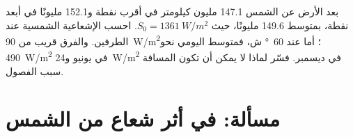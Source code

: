 \begin{exercise}[$\star\star\star$]\label{exo:g10:earth-energy-budget:15}
بعد الأرض عن الشمس \num{147.1} مليون كيلومتر في أقرب نقطة
و\num{152.1} مليونًا في أبعد نقطة، بمتوسط
\num{149.6} مليونًا، حيث $S_0 = \qty{1361}{W/m^2}$. احسب الإشعاعية الشمسية
عند الطرفين. والفرق قريب من
\qty{90}{W/m^2}؛ أما عند \qty{60}{\degree} ش، فمتوسط  اليومي نحو
\qty{490}{W/m^2} في يونيو و\qty{24}{W/m^2} في ديسمبر. فسّر لماذا لا يمكن أن
تكون المسافة سبب الفصول.
\end{exercise}

\section{مسألة: في أثر شعاع من الشمس}

